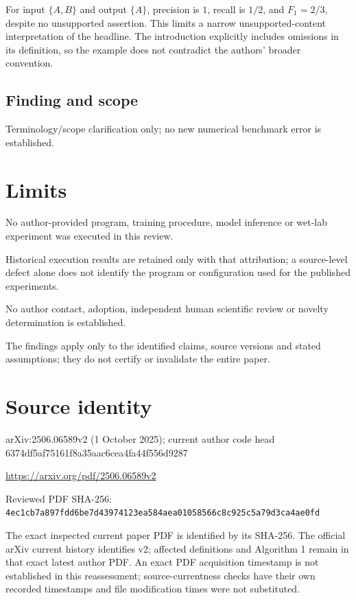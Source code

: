 \documentclass[11pt]{article}
\begin{document}
For input \(\{A,B\}\) and output \(\{A\}\), precision is \(1\), recall is \(1/2\), and \(F_1=2/3\), despite no unsupported assertion. This limits a narrow unsupported-content interpretation of the headline. The introduction explicitly includes omissions in its definition, so the example does not contradict the authors' broader convention.

\subsection*{Finding and scope}

Terminology/scope clarification only; no new numerical benchmark error is established.

\section*{Limits}

No author-provided program, training procedure, model inference or wet-lab experiment was executed in this review.\par

Historical execution results are retained only with that attribution; a source-level defect alone does not identify the program or configuration used for the published experiments.\par

No author contact, adoption, independent human scientific review or novelty determination is established.\par

The findings apply only to the identified claims, source versions and stated assumptions; they do not certify or invalidate the entire paper.\par

\section*{Source identity}

arXiv:2506.06589v2 (1 October 2025); current author code head 6374df5af75161f8a35aac6cea4fa44f556d9287

\url{https://arxiv.org/pdf/2506.06589v2}

Reviewed PDF SHA-256: \nolinkurl{4ec1cb7a897fdd6be7d43974123ea584aea01058566c8c925c5a79d3ca4ae0fd}

The exact inspected current paper PDF is identified by its SHA-256. The official arXiv current history identifies v2; affected definitions and Algorithm 1 remain in that exact latest author PDF. An exact PDF acquisition timestamp is not established in this reassessment; source-currentness checks have their own recorded timestamps and file modification times were not substituted.
\end{document}
